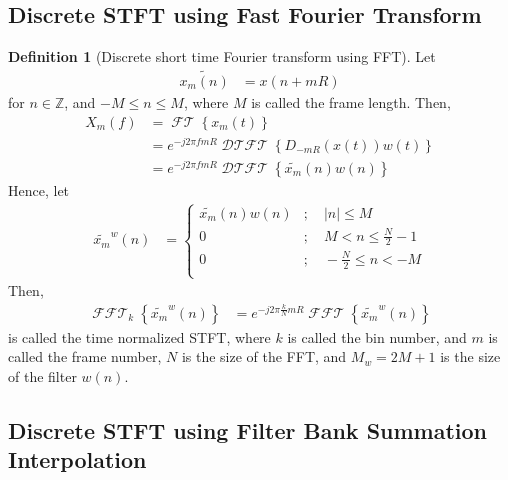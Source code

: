 \documentclass[titlepage, fleqn, a4paper, 12pt, twoside]{article}
\theoremstyle{definition}
\newtheorem{definition}{Definition}
\theoremstyle{theorem}
\renewcommand{\tilde}{\widetilde}
\DeclareMathOperator{\FT}{\mathcal{FT}}
\DeclareMathOperator{\DTFT}{\mathcal{DTFT}}
\DeclareMathOperator{\FFT}{\mathcal{FFT}}
\begin{document}
\subsection{Discrete STFT using Fast Fourier Transform}

\begin{definition}[Discrete short time Fourier transform using FFT]
	Let
	\begin{align*}
		\tilde{x_m(n)} &= x(n + m R)
	\end{align*}
	for $n \in \mathbb{Z}$, and $-M \le n \le M$, where $M$ is called the frame length.
	Then,
	\begin{align*}
		X_m(f) &= \FT\left\{ x_m(t) \right\}\\
		&= e^{-j 2 \pi f m R} \DTFT\left\{ D_{-m R}\left( x(t) \right) w(t) \right\}\\
		&= e^{-j 2 \pi f m R} \DTFT\left\{ \tilde{x_m}(n) w(n) \right\}
	\end{align*}
	Hence, let
	\begin{align*}
		\tilde{x_m}^{w}(n) &=
			\begin{cases}
				\tilde{x_m}(n) w(n) &;\quad |n| \le M\\
				0 &;\quad M < n \le \frac{N}{2} - 1\\
				0 &;\quad -\frac{N}{2} \le n < -M\\
			\end{cases}
	\end{align*}
	Then,
	\begin{align*}
		\FFT_{k}\left\{ \tilde{x_m}^{w}(n) \right\} &= e^{-j 2 \pi \frac{k}{N} m R} \FFT\left\{ \tilde{x_m}^w(n) \right\}
	\end{align*}
	is called the time normalized STFT, where $k$ is called the bin number, and $m$ is called the frame number, $N$ is the size of the FFT, and $M_w = 2 M + 1$ is the size of the filter $w(n)$.
\end{definition}

\subsection{Discrete STFT using Filter Bank Summation Interpolation}
\end{document}

